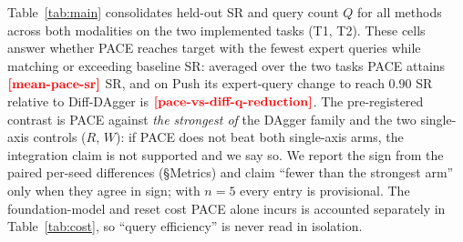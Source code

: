 \documentclass[letterpaper]{article} %
\newcommand{\PH}[1]{{\color{red}\textbf{[#1]}}}
\begin{document}
Table~\ref{tab:main} consolidates held-out SR and query count $Q$ for all methods
across both modalities on the two implemented tasks (T1, T2). These cells answer
whether PACE reaches target with the fewest expert queries while matching or exceeding
baseline SR: averaged over the two tasks PACE attains $\PH{mean-pace-sr}$ SR, and on
Push its expert-query change to reach $0.90$ SR relative to Diff-DAgger is
$\PH{pace-vs-diff-q-reduction}$. The pre-registered contrast is PACE against \emph{the
strongest of} the DAgger family and the two single-axis controls ($R$, $W$): if PACE
does not beat both single-axis arms, the integration claim is not supported and we say
so. We report the sign from the paired per-seed differences (\S Metrics) and claim
``fewer than the strongest arm'' only when they agree in sign; with $n{=}5$ every
entry is provisional. The foundation-model and reset cost PACE alone incurs is
accounted separately in Table~\ref{tab:cost}, so ``query efficiency'' is never read in
isolation.
\end{document}
